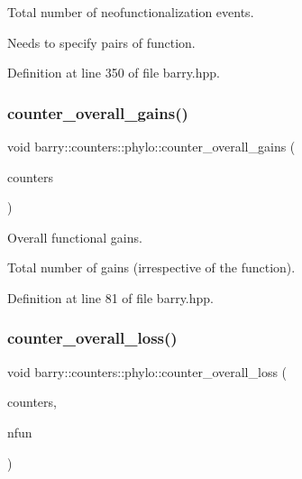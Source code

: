 Total number of neofunctionalization events. 

Needs to specify pairs of function. 

Definition at line 350 of file barry.\+hpp.

\mbox{\label{namespacebarry_1_1counters_1_1phylo_a6f3a551165270e27f874d3df4d07cf8b}} 
\subsubsection{\texorpdfstring{counter\+\_\+overall\+\_\+gains()}{counter\_overall\_gains()}}
{\footnotesize\ttfamily void barry\+::counters\+::phylo\+::counter\+\_\+overall\+\_\+gains (\begin{DoxyParamCaption}\item[{\hyperlink{namespacebarry_1_1counters_1_1phylo_a2f117d1cd1dff67e1539cbc0aef5766a}{Phylo\+Counter\+Vector} $\ast$}]{counters }\end{DoxyParamCaption})\hspace{0.3cm}{\ttfamily [inline]}}



Overall functional gains. 

Total number of gains (irrespective of the function). 

Definition at line 81 of file barry.\+hpp.

\mbox{\label{namespacebarry_1_1counters_1_1phylo_a45ae9af92d4821d218c99eaddaa9471e}} 
\subsubsection{\texorpdfstring{counter\+\_\+overall\+\_\+loss()}{counter\_overall\_loss()}}
{\footnotesize\ttfamily void barry\+::counters\+::phylo\+::counter\+\_\+overall\+\_\+loss (\begin{DoxyParamCaption}\item[{\hyperlink{namespacebarry_1_1counters_1_1phylo_a2f117d1cd1dff67e1539cbc0aef5766a}{Phylo\+Counter\+Vector} $\ast$}]{counters,  }\item[{\hyperlink{namespacebarry_a11dfc53ddb4672278319aa04f1e09a6c}{uint}}]{nfun }\end{DoxyParamCaption})\hspace{0.3cm}{\ttfamily [inline]}}



